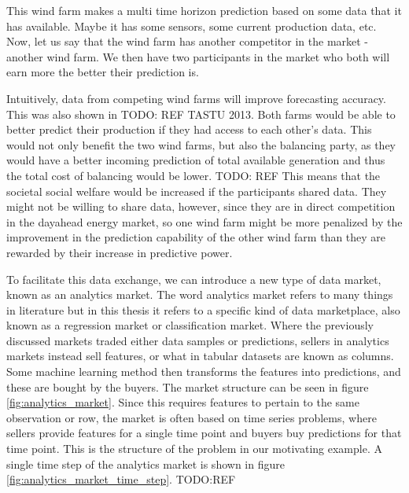 This wind farm makes a multi time horizon prediction based on some data that it
has available. Maybe it has some sensors, some current production data, etc.
Now, let us say that the wind farm has another competitor in the market -
another wind farm. We then have two participants in the market who both will
earn more the better their prediction is.

Intuitively, data from competing wind farms will improve forecasting accuracy.
This was also shown in TODO: REF TASTU 2013. Both farms would be able to
better predict their production if they had access to each other's data. This
would not only benefit the two wind farms, but also the balancing party, as
they would have a better incoming prediction of total available generation and
thus the total cost of balancing would be lower. TODO: REF This means that the
societal social welfare would be increased if the participants shared data.
They might not be willing to share data, however, since they are in direct
competition in the dayahead energy market, so one wind farm might be more
penalized by the improvement in the prediction capability of the other wind
farm than they are rewarded by their increase in predictive power.

To facilitate this data exchange, we can introduce a new type of data market,
known as an analytics market. The word analytics market refers to many things
in literature but in this thesis it refers to a specific kind of data
marketplace, also known as a regression market or classification market. Where
the previously discussed markets traded either data samples or predictions,
sellers in analytics markets instead sell features, or what in tabular datasets
are known as columns. Some machine learning method then transforms the features
into predictions, and these are bought by the buyers. The market structure can
be seen in figure \ref{fig:analytics_market}. Since this requires features to
pertain to the same observation or row, the market is often based on time
series problems, where sellers provide features for a single time point and
buyers buy predictions for that time point. This is the structure of the
problem in our motivating example. A single time step of the analytics market
is shown in figure \ref{fig:analytics_market_time_step}. TODO:REF

